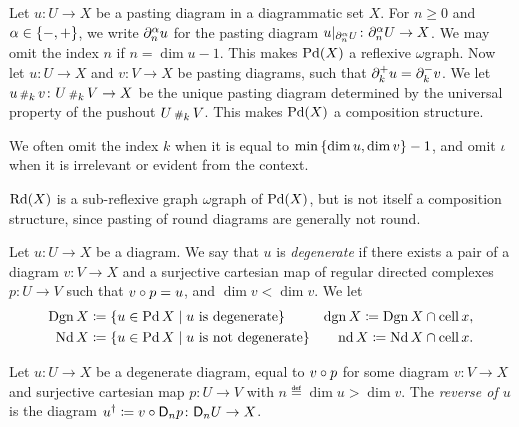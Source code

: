 \begin{dfn} 
    Let \( u \colon U \to X \) be a pasting diagram in a diagrammatic set \( X \).
    For \( n \geq 0 \) and \( \alpha \in \left\{ {-, +} \right\} \), we write \( \partial_{n}^{\alpha} u \) for the pasting diagram \( \restr{u}{\bd{n}{\a}U} \colon \bd{n}{\a} U \to X \).
    We may omit the index \( n \) if \( n = \dim u - 1 \).
    This makes \( \operatorname{Pd}(X) \) a reflexive \( \omega \)\nbd graph.
    Now let \( u \colon U \to X \) and \( v \colon V \to X \) be pasting diagrams, such that \( \partial_{k}^{+} u = \partial_{k}^{-} v \).
    We let \( u \,{\scriptstyle\#}_{k}\, v \colon U \,{\scriptstyle\#}_{k}\, V \to X \) be the unique pasting diagram determined by the universal property of the pushout \( U \,{\scriptstyle\#}_{k}\, V \).
    This makes \( \operatorname{Pd}(X) \) a composition structure.
\end{dfn}
\noindent We often omit the index \( k \) when it is equal to \( \min \left\{ {\dim u, \dim v} \right\} - 1 \), and omit \( \iota \) when it is irrelevant or evident from the context.

\begin{rmk}
    \( \operatorname{Rd}(X) \) is a sub-reflexive graph \( \omega \)\nbd graph of \( \operatorname{Pd}(X) \), but is not itself a composition structure, since pasting of round diagrams are generally not round. 
\end{rmk}

\begin{dfn} 
    Let \( u \colon U \to X \) be a diagram.
    We say that \( u \) is \emph{degenerate} if there exists a pair of a diagram \( v \colon V \to X \) and a surjective cartesian map of regular directed complexes \( p \colon U \to V \) such that \( v \circ p = u \), and \( \dim v < \dim v \). 
    We let
    \begin{align*}
        \operatorname{Dgn} X &\coloneqq \left\{ {u \in \operatorname{Pd} X \mid u \text{ is degenerate}} \right\} & \operatorname{dgn} X \coloneqq \operatorname{Dgn} X \cap \operatorname{cell} x,\\
        \operatorname{Nd} X &\coloneqq \left\{ {u \in \operatorname{Pd} X \mid u \text{ is not degenerate}} \right\} & \operatorname{nd} X \coloneqq \operatorname{Nd} X \cap \operatorname{cell} x.
    \end{align*}
\end{dfn}

\begin{dfn} 
    Let \( u \colon U \to X \) be a degenerate diagram, equal to \( v \circ p \) for some diagram \( v \colon V \to X \) and surjective cartesian map \( p \colon U \to V \) with \( n \eqdef \dim u > \dim v \).
    The \emph{reverse of \( u \)} is the diagram \( {u}^\dag \coloneqq v \circ \mathsf{D}_{n}{p} \colon \mathsf{D}_{n}{U} \to X \).
\end{dfn}

